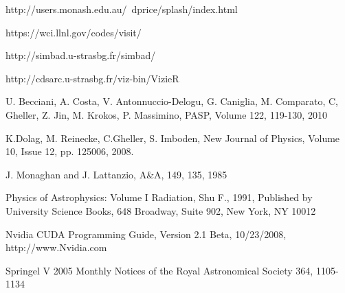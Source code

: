 \documentclass[1p,times]{elsarticle}
\begin{document}
\begin{thebibliography}{00}
 http://users.monash.edu.au/~dprice/splash/index.html

 https://wci.llnl.gov/codes/visit/

 http://simbad.u-strasbg.fr/simbad/

 http://cdsarc.u-strasbg.fr/viz-bin/VizieR

U. Becciani, A. Costa, V. Antonnuccio-Delogu, G. Caniglia, M. Comparato, 
C, Gheller, Z. Jin, M. Krokos, P. Massimino, PASP, 
Volume 122, 119-130, 2010

K.Dolag, M. Reinecke, C.Gheller, S. Imboden, 
New Journal of Physics, Volume 10, Issue 12, pp. 125006, 2008.




 J. Monaghan and J. Lattanzio, A\&A, 149, 135, 1985

 Physics of Astrophysics: Volume I Radiation, Shu F., 1991,
Published by University Science Books, 648 Broadway, Suite 902, New York, NY 10012


 Nvidia CUDA Programming Guide, Version 2.1 Beta, 10/23/2008, http://www.Nvidia.com

 Springel V 2005 Monthly Notices of the Royal Astronomical Society 364, 1105-1134

\end{thebibliography}
\end{document}
